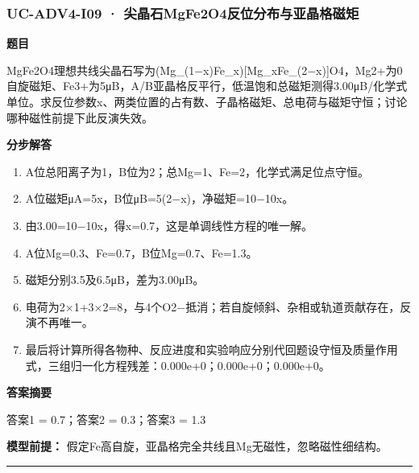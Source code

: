 \documentclass[UTF8,11pt,a4paper]{ctexart}
\begin{document}
\subsubsection*{UC-ADV4-I09 · 尖晶石MgFe2O4反位分布与亚晶格磁矩}
\noindent\textbf{题目}\par
MgFe2O4理想共线尖晶石写为(Mg\_(1−x)Fe\_x)[Mg\_xFe\_(2−x)]O4，Mg2+为0自旋磁矩、Fe3+为5μB，A/B亚晶格反平行，低温饱和总磁矩测得3.00μB/化学式单位。求反位参数x、两类位置的占有数、子晶格磁矩、总电荷与磁矩守恒；讨论哪种磁性前提下此反演失效。\par
\medskip\noindent\textbf{分步解答}
\begin{enumerate}
\item A位总阳离子为1，B位为2；总Mg=1、Fe=2，化学式满足位点守恒。
\item A位磁矩μA=5x，B位μB=5(2−x)，净磁矩=10−10x。
\item 由3.00=10−10x，得x=0.7，这是单调线性方程的唯一解。
\item A位Mg=0.3、Fe=0.7，B位Mg=0.7、Fe=1.3。
\item 磁矩分别3.5及6.5μB，差为3.00μB。
\item 电荷为2×1+3×2=8，与4个O2−抵消；若自旋倾斜、杂相或轨道贡献存在，反演不再唯一。
\item 最后将计算所得各物种、反应进度和实验响应分别代回题设守恒及质量作用式，三组归一化方程残差：0.000e+0；0.000e+0；0.000e+0。
\end{enumerate}
\noindent\textbf{答案摘要}\par
答案1 = 0.7；答案2 = 0.3；答案3 = 1.3\par
\noindent\textbf{模型前提：}
假定Fe高自旋，亚晶格完全共线且Mg无磁性，忽略磁性细结构。\par
\medskip\hrule\medskip
{}
\end{document}
